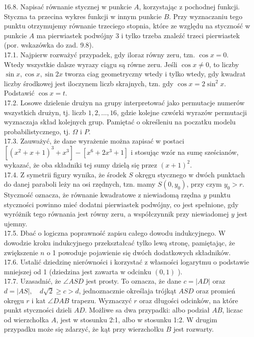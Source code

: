 \documentclass[10pt]{article}
\begin{document}
16.8. Napisać równanie stycznej w punkcie $A$, korzystając z pochodnej funkcji. Styczna ta przecina wykres funkcji w innym punkcie $B$. Przy wyznaczaniu tego punktu otrzymujemy równanie trzeciego stopnia, które ze względu na styczność w punkcie $A$ ma pierwiastek podwójny 3 i tylko trzeba znaleźć trzeci pierwiastek (por. wskazówka do zad. 9.8).\\
17.1. Najpierw rozważyć przypadek, gdy iloraz równy zeru, tzn. $\cos x=0$. Wtedy wszystkie dalsze wyrazy ciągu są równe zeru. Jeśli $\cos x \neq 0$, to liczby $\sin x, \cos x, \sin 2 x$ tworza ciag geometryczny wtedy i tylko wtedy, gdy kwadrat liczby środkowej jest iloczynem liczb skrajnych, tzn. gdy $\cos x=2 \sin ^{2} x$. Podstawić $\cos x=t$.\\
17.2. Losowe dzielenie drużyn na grupy interpretować jako permutacje numerów wszystkich drużyn, tj. liczb $1,2, \ldots, 16$, gdzie kolejne czwórki wyrazów permutacji wyznaczaja skład kolejnych grup. Pamiętać o określeniu na poczatku modelu probabilistycznego, tj. $\Omega$ i $P$.\\
17.3. Zauważyć, że dane wyrażenie można zapisać w postaci $\left[\left(x^{2}+x+1\right)^{3}+x^{3}\right]-\left[x^{6}+2 x^{3}+1\right]$ i stosując wzór na sumę sześcianów, wykazać, że oba składniki tej sumy dzielą się przez $(x+1)^{2}$.\\
17.4. Z symetrii figury wynika, że środek $S$ okręgu stycznego w dwóch punktach do danej paraboli leży na osi rzędnych, tzn. mamy $S\left(0, y_{0}\right)$, przy czym $y_{0}>r$. Styczność oznacza, że równanie kwadratowe z niewiadomą rzędna $y$ punktu styczności powinno mieć dodatni pierwiastek podwójny, co jest spełnione, gdy wyróżnik tego równania jest równy zeru, a współczynnik przy niewiadomej $y$ jest ujemny.\\
17.5. Dbać o logiczna poprawność zapisu całego dowodu indukcyjnego. W dowodzie kroku indukcyjnego przekształcać tylko lewą stronę, pamiętając, że zwiększenie $n$ o 1 powoduje pojawienie się dwóch dodatkowych składników.\\
17.6. Ustalić dziedzinę nierówności i korzystać z własności logarytmu o podstawie mniejszej od 1 (dziedzina jest zawarta w odcinku $(0,1)$ ).\\
17.7. Uzasadnić, że $\angle A S D$ jest prosty. To oznacza, że dane $c=|A D|$ oraz $d=|A S|, \quad d \sqrt{2} \geq c>d$, jednoznacznie określaja trójkąt $A S D$ oraz promień okręgu $r$ i kat $\angle D A B$ trapezu. Wyznaczyć $r$ oraz długości odcinków, na które punkt styczności dzieli $A D$. Możliwe sa dwa przypadki: albo podział $A B$, liczac od wierzchołka $A$, jest w stosunku 2:1, albo w stosunku 1:2. W drugim przypadku może się zdarzyć, że kąt przy wierzchołku $B$ jest rozwarty.\\
\end{document}
